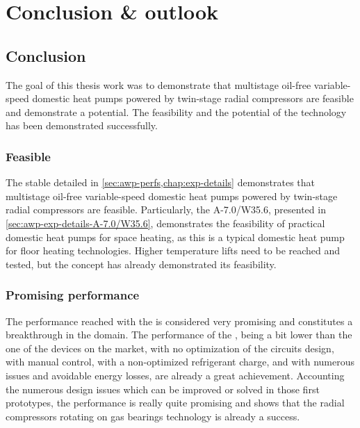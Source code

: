 \chapter{Conclusion \& outlook}
\label{chap:conclusion}
\resetallacronyms

\vspace{1em}

\section{Conclusion}
\label{sec:conclusion}

The goal of this thesis work was to demonstrate that multistage
oil-free variable-speed domestic heat pumps powered by twin-stage
radial compressors are feasible and demonstrate a potential. The
feasibility and the potential of the technology has been demonstrated
successfully.

\vspace{1em}

\subsection{Feasible}
\label{sec:concl-feasible}

The stable \OP{} detailed in \cref{sec:awp-perfs,chap:exp-details}
demonstrates that multistage oil-free variable-speed domestic heat
pumps powered by twin-stage radial compressors are
feasible. Particularly, the \OP{} A-7.0/W35.6, presented in
\cref{sec:awp-exp-details-A-7.0/W35.6}, demonstrates the feasibility
of practical domestic heat pumps for space heating, as this \OP{} is a
typical domestic heat pump \OP{} for floor heating
technologies. Higher temperature lifts need to be reached and tested,
but the concept has already demonstrated its feasibility.

\vspace{1em}

\subsection{Promising performance}
\label{sec:concl-potential}

The performance reached with the \AWP{} is considered very promising
and constitutes a breakthrough in the domain. The performance of the
\AWP{}, being a bit lower than the one of the devices on the market,
with no optimization of the circuits design, with manual control, with
a non-optimized refrigerant charge, and with numerous issues and
avoidable energy losses, are already a great achievement. Accounting
the numerous design issues which can be improved or solved in those
first prototypes, the performance is really quite promising and shows
that the radial compressors rotating on gas bearings technology is
already a success.

